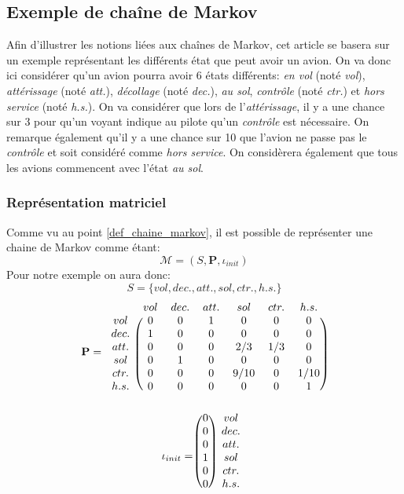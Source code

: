 \documentclass[letterpaper]{article}
\begin{document}
  \subsection{Exemple de chaîne de Markov}
    Afin d'illustrer les notions liées aux chaînes de Markov, cet article se 
    basera sur un exemple représentant les différents état que peut avoir 
    un avion.  On va donc ici considérer qu'un avion pourra avoir 6 états 
    différents: \textit{en vol} (noté \textit{vol}), \textit{attérissage} 
    (noté \textit{att.}), \textit{décollage} (noté \textit{dec.}), 
    \textit{au sol}, \textit{contrôle} (noté \textit{ctr.})
    et \textit{hors service} (noté \textit{h.s.}).
    On va considérer que lors de l'\textit{attérissage}, il y a une chance sur 
    3 pour qu'un voyant indique au pilote qu'un \textit{contrôle} est 
    nécessaire. On remarque également qu'il y a une chance sur 10 que 
    l'avion ne passe pas le \textit{contrôle} et soit considéré comme 
    \textit{hors service}.  On considèrera également que tous les avions commencent
    avec l'état \textit{au sol}.
    
    \subsubsection{Représentation matriciel}
      Comme vu au point \ref{def_chaine_markov}, il est possible de représenter une
      chaine de Markov comme étant:
      $$\mathcal{M} = (S, \mathbf{P}, \iota_{init})$$
      Pour notre exemple on aura donc:
      $$S = \{vol, dec., att., sol, ctr., h.s.\} $$
      $$ \mathbf{P} = 
	\begin{blockarray}{ccccccc}
	& vol & dec. & att. & sol & ctr. & h.s. \\
	  \begin{block}{c(cccccc)}
	    vol  & 0 & 0 & 1 & 0    & 0   & 0    \\
	    dec. & 1 & 0 & 0 & 0    & 0   & 0    \\
	    att. & 0 & 0 & 0 & 2/3  & 1/3 & 0    \\
	    sol  & 0 & 1 & 0 & 0    & 0   & 0    \\
	    ctr. & 0 & 0 & 0 & 9/10 & 0   & 1/10 \\
	    h.s. & 0 & 0 & 0 & 0    & 0   & 1    \\
	  \end{block}
	\end{blockarray}
      $$
      $$\iota_{init} = 
	\begin{blockarray}{cc}
	  \begin{block}{( c ) c}
	    0 & vol \\
	    0 & dec.\\
	    0 & att.\\
	    1 & sol\\
	    0 & ctr.\\
	    0 & h.s.\\
	  \end{block}
	\end{blockarray}
      $$
      
\end{document}
